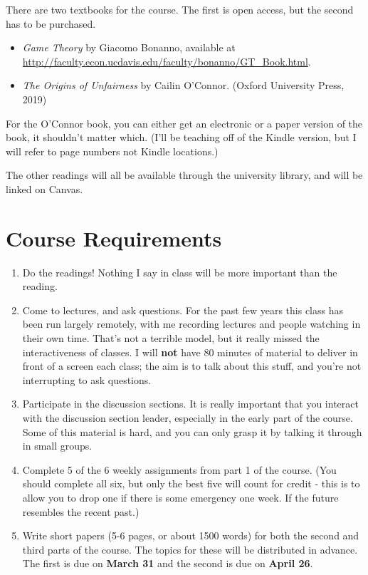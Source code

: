 \documentclass[
]{article}
\providecommand{\tightlist}{%
  \setlength{\itemsep}{0pt}\setlength{\parskip}{0pt}}
\begin{document}
There are two textbooks for the course. The first is open access, but
the second has to be purchased.

\begin{itemize}
\tightlist
\item
  \emph{Game Theory} by Giacomo Bonanno, available at
  \url{http://faculty.econ.ucdavis.edu/faculty/bonanno/GT_Book.html}.
\item
  \emph{The Origins of Unfairness} by Cailin O'Connor. (Oxford
  University Press, 2019)
\end{itemize}

For the O'Connor book, you can either get an electronic or a paper
version of the book, it shouldn't matter which. (I'll be teaching off of
the Kindle version, but I will refer to page numbers not Kindle
locations.)

The other readings will all be available through the university library,
and will be linked on Canvas.

\newpage

\hypertarget{course-requirements}{%
\section{Course Requirements}\label{course-requirements}}

\begin{enumerate}
\def\labelenumi{\arabic{enumi}.}
\tightlist
\item
  Do the readings! Nothing I say in class will be more important than
  the reading.
\item
  Come to lectures, and ask questions. For the past few years this class
  has been run largely remotely, with me recording lectures and people
  watching in their own time. That's not a terrible model, but it really
  missed the interactiveness of classes. I will \textbf{not} have 80
  minutes of material to deliver in front of a screen each class; the
  aim is to talk about this stuff, and you're not interrupting to ask
  questions.
\item
  Participate in the discussion sections. It is really important that
  you interact with the discussion section leader, especially in the
  early part of the course. Some of this material is hard, and you can
  only grasp it by talking it through in small groups.
\item
  Complete 5 of the 6 weekly assignments from part 1 of the course. (You
  should complete all six, but only the best five will count for credit
  - this is to allow you to drop one if there is some emergency one
  week. If the future resembles the recent past.)
\item
  Write short papers (5-6 pages, or about 1500 words) for both the
  second and third parts of the course. The topics for these will be
  distributed in advance. The first is due on \textbf{March 31} and the
  second is due on \textbf{April 26}.
\end{enumerate}
\end{document}
